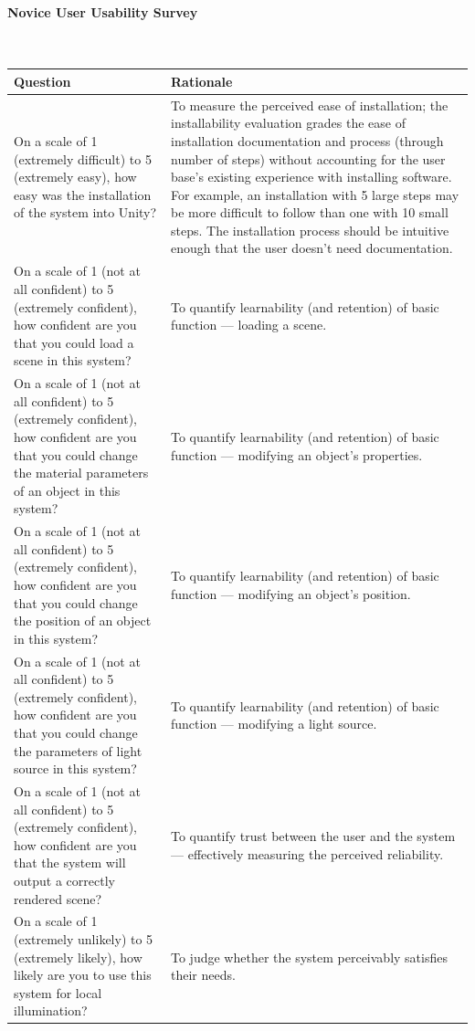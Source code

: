 \documentclass[12pt, titlepage]{article}
\begin{document}
\paragraph{Novice User Usability Survey}\label{survey:novice}
~\newline
\begin{tabular}{p{8cm}|p{8cm}}
	\hline
	\textbf{Question} & \textbf{Rationale} \\
	\hline
	On a scale of 1 (extremely difficult) to 5 (extremely easy), how easy was 
	the installation of the system into Unity? & To measure the perceived ease 
	of installation; the installability evaluation grades the ease of 
	installation documentation and process (through number of steps) without 
	accounting for the user base's existing experience with installing 
	software. For example, an installation with 5 large steps may be more 
	difficult to follow than one with 10 small steps. The installation process 
	should be intuitive enough that the user doesn't need documentation.\\
	On a scale of 1 (not at all confident) to 5 (extremely confident), how 
	confident are you that you could load a scene in this system? & To quantify 
	learnability (and retention) of basic function --- loading a scene. \\
	On a scale of 1 (not at all confident) to 5 (extremely confident), how 
	confident are you that you could change the material parameters of an 
	object in this system? & To quantify learnability (and retention) of basic 
	function --- modifying an object's properties. \\
	On a scale of 1 (not at all confident) to 5 (extremely confident), how 
	confident are you that you could change the position of an object in this 
	system? & To quantify learnability (and retention) of basic function --- 
	modifying an object's position. \\	
	On a scale of 1 (not at all confident) to 5 (extremely confident), how 
	confident are you that you could change the parameters of light source in 
	this system? & To quantify learnability (and retention) of basic function 
	--- modifying a light source. \\	
	On a scale of 1 (not at all confident) to 5 (extremely confident), how 
	confident are you that the system will output a correctly rendered scene? & 
	To quantify trust between the user and the system --- effectively measuring 
	the perceived reliability. \\
	On a scale of 1 (extremely unlikely) to 5 (extremely likely), how 
	likely are you to use this system for local illumination? & To judge 
	whether the system perceivably satisfies their needs. \\
	\hline
\end{tabular}
\end{document}
